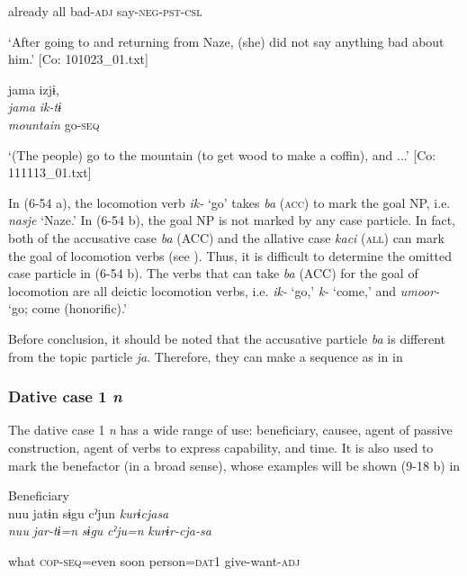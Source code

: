       already  all  bad-\textsc{adj}  say-\textsc{neg}-\textsc{pst}-\textsc{csl}

\glt ‘After going to and returning from Naze, (she) did not say anything bad about him.’ [Co: 101023\_01.txt]
\z

 \ex {\TM}  jama  izjɨ,\\
\gll \textit{jama}  \textit{ik-tɨ}\\

      \textit{mountain}  go-\textsc{seq}

\glt ‘(The people) go to the mountain (to get wood to make a coffin), and ...’ [Co: 111113\_01.txt]
\z

In (6-54 a), the locomotion verb \textit{ik-} ‘go’ takes \textit{ba} (\textsc{acc}) to mark the goal NP, i.e. \textit{nasje} ‘Naze.’ In (6-54 b), the goal NP is not marked by any case particle. In fact, both of the accusative case \textit{ba} (ACC) and the allative case \textit{kaci} (\textsc{all}) can mark the goal of locomotion verbs (see ). Thus, it is difficult to determine the omitted case particle in (6-54 b). The verbs that can take \textit{ba} (ACC) for the goal of locomotion are all deictic locomotion verbs, i.e. \textit{ik-} ‘go,’ \textit{k-} ‘come,’ and \textit{umoor-} ‘go; come (honorific).’

  Before conclusion, it should be noted that the accusative particle \textit{ba} is different from the topic particle \textit{ja}. Therefore, they can make a sequence as in  in 

\subsubsection{Dative case 1 \textit{n}}

The dative case 1 \textit{n} has a wide range of use: beneficiary, causee, agent of passive construction, agent of verbs to express capability, and time. It is also used to mark the benefactor (in a broad sense), whose examples will be shown (9-18 b) in 

\ea\label{ex:6-55}
\ea Beneficiary\\
{\TM}
\gll  nuu  jatɨn  sɨgu  cˀjun  \textit{kurɨcjasa}\\

      \textit{nuu}  \textit{jar-tɨ=n}  \textit{sɨgu}  \textit{cˀju=n}  \textit{kurɨr-cja-sa}

      what  \textsc{cop}-\textsc{seq}=even  soon  person=\textsc{dat}1  give-want-\textsc{adj}

